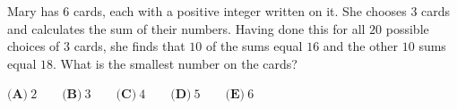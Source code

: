 Mary has $6$ cards, each with a positive integer written on it. She chooses $3$ cards and calculates the sum of their numbers. Having done this for all $20$ possible choices of $3$ cards, she finds that $10$ of the sums equal $16$ and the other $10$ sums equal $18$. What is the smallest number on the cards?

$\textbf{(A)}\ 2\qquad\textbf{(B)}\ 3\qquad\textbf{(C)}\ 4\qquad\textbf{(D)}\ 5\qquad\textbf{(E)}\ 6$
